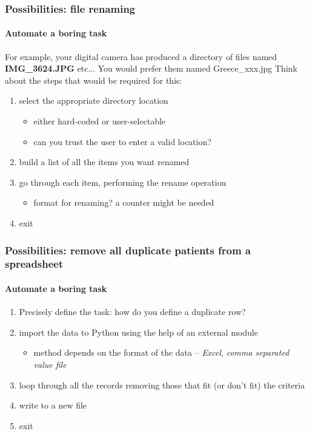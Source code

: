 \documentclass{beamer}
\begin{document}
    \begin{frame}
	    \frametitle{Possibilities: file renaming}
	    \framesubtitle{Automate a boring task}
	    For example, your digital camera has produced a directory of files named \textbf{IMG\_3624.JPG} etc...
	    You would prefer them named Greece\_xxx.jpg
	    \newline
	    Think about the steps that would be required for this:
	    \begin{enumerate}
		    \item select the appropriate directory location
			    \begin{itemize}
				    \item either hard-coded or user-selectable
				    \item can you trust the user to enter a valid location?
			    \end{itemize}
		    \item build a list of all the items you want renamed
		    \item go through each item, performing the rename operation
			    \begin{itemize}
				    \item format for renaming? a counter might be needed
			    \end{itemize}
		    \item exit
	    \end{enumerate}
    \end{frame}

    \begin{frame}
	    \frametitle{Possibilities: remove all duplicate patients from a spreadsheet}
	    \framesubtitle{Automate a boring task}
	    \begin{enumerate}
		    \item Precisely define the task: how do you define a duplicate row?
		    \item import the data to Python using the help of an external module
			    \begin{itemize}
				    \item method depends on the format of the data -- \textit{Excel}, \textit{comma separated value file}
			    \end{itemize}
		    \item loop through all the records removing those that fit (or don't fit) the criteria
		    \item write to a new file
		    \item exit
	    \end{enumerate}
    \end{frame}
\end{document}
